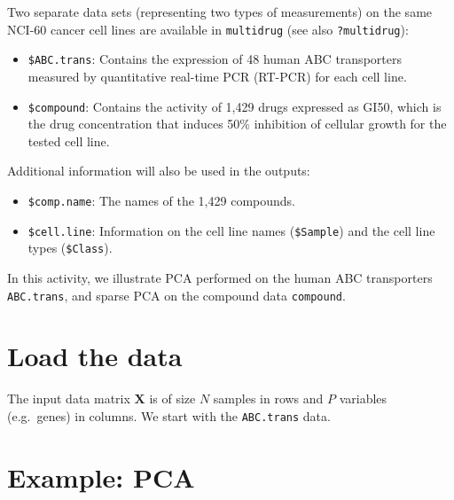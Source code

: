 \documentclass[
]{book}
\newenvironment{Shaded}{\begin{snugshade}}{\end{snugshade}}
\newcommand{\CommentTok}[1]{\textcolor[rgb]{0.56,0.35,0.01}{\textit{#1}}}
\newcommand{\FunctionTok}[1]{\textcolor[rgb]{0.00,0.00,0.00}{#1}}
\newcommand{\NormalTok}[1]{#1}
\newcommand{\OtherTok}[1]{\textcolor[rgb]{0.56,0.35,0.01}{#1}}
\newcommand{\SpecialCharTok}[1]{\textcolor[rgb]{0.00,0.00,0.00}{#1}}
\begin{document}
Two separate data sets (representing two types of measurements) on the same NCI-60 cancer cell lines are available in \texttt{multidrug} (see also \texttt{?multidrug}):

\begin{itemize}
\item
  \texttt{\$ABC.trans}: Contains the expression of 48 human ABC transporters measured by quantitative real-time PCR (RT-PCR) for each cell line.
\item
  \texttt{\$compound}: Contains the activity of 1,429 drugs expressed as GI50, which is the drug concentration that induces 50\% inhibition of cellular growth for the tested cell line.
\end{itemize}

Additional information will also be used in the outputs:

\begin{itemize}
\item
  \texttt{\$comp.name}: The names of the 1,429 compounds.
\item
  \texttt{\$cell.line}: Information on the cell line names (\texttt{\$Sample}) and the cell line types (\texttt{\$Class}).
\end{itemize}

In this activity, we illustrate PCA performed on the human ABC transporters \texttt{ABC.trans}, and sparse PCA on the compound data \texttt{compound}.

\hypertarget{03:load-data}{%
\section{Load the data}\label{03:load-data}}

The input data matrix \(\boldsymbol{X}\) is of size \(N\) samples in rows and \(P\) variables (e.g.~genes) in columns. We start with the \texttt{ABC.trans} data.

\begin{Shaded}
\end{Shaded}

\hypertarget{03:pca}{%
\section{Example: PCA}\label{03:pca}}
\end{document}
